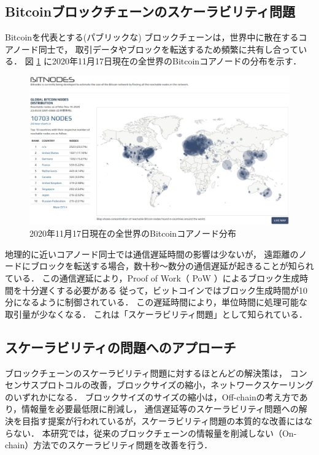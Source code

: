 \documentclass[a4paper,12pt]{jsarticle}
\begin{document}
\subsection{Bitcoinブロックチェーンのスケーラビリティ問題}
Bitcoinを代表とする(パブリックな) ブロックチェーンは，世界中に散在するコアノード同士で，
取引データやブロックを転送するため頻繁に共有し合っている．
図 \ref{fig:bitnodes} に2020年11月17日現在の全世界のBitcoinコアノードの分布を示す．

\begin{figure}[H]%
  \begin{center}
    \includegraphics[width=130mm]{pht/bitnodes1117.eps}
  \end{center}
  \caption{2020年11月17日現在の全世界のBitcoinコアノード分布}
  \label{fig:bitnodes}
\end{figure}

地理的に近いコアノード同士では通信遅延時間の影響は少ないが，
遠距離のノードにブロックを転送する場合，数十秒〜数分の通信遅延が起きることが知られている．
この通信遅延により，Proof of Work（ PoW ）によるブロック生成時間を十分遅くする必要がある
従って，ビットコインではブロック生成時間が10分になるように制御されている．
この遅延時間により，単位時間に処理可能な取引量が少なくなる．
これは「スケーラビリティ問題」として知られている． 

\subsection{スケーラビリティの問題へのアプローチ}
ブロックチェーンのスケーラビリティ問題に対するほとんどの解決策は，
コンセンサスプロトコルの改善，ブロックサイズの縮小，ネットワークスケーリングのいずれかになる．
ブロックサイズのサイズの縮小は，Off-chainの考え方であり，情報量を必要最低限に削減し，
通信遅延等のスケーラビリティ問題への解決を目指す提案が行われているが，スケーラビリティ問題の本質的な改善にはならない．
本研究では，従来のブロックチェーンの情報量を削減しない（On-chain）方法でのスケーラビリティ問題を改善を行う．
\end{document}
